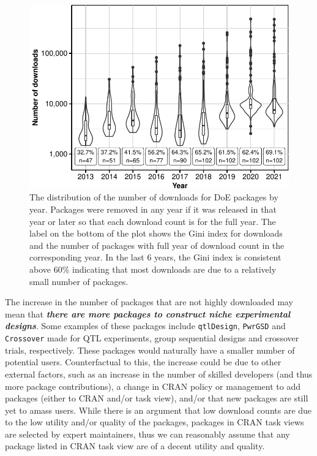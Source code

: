 \documentclass{article}
\begin{document}
\begin{figure}[htbp]

{\centering \includegraphics{figures/download-share-1} 

}

\caption{The distribution of the number of downloads for DoE packages by year. Packages were removed in any year if it was released in that year or later so that each download count is for the full year. The label on the bottom of the plot shows the Gini index for downloads and the number of packages with full year of download count in the corresponding year. In the last 6 years, the Gini index is consistent above 60\% indicating that most downloads are due to a relatively small number of packages. }\label{fig:download-share}
\end{figure}

The increase in the number of packages that are not highly downloaded
may mean that \textbf{\emph{there are more packages to construct niche
experimental designs}}. Some examples of these packages include
\texttt{qtlDesign}, \texttt{PwrGSD} and \texttt{Crossover} made for QTL
experiments, group sequential designs and crossover trials,
respectively. These packages would naturally have a smaller number of
potential users. Counterfactual to this, the increase could be due to
other external factors, such as an increase in the number of skilled
developers (and thus more package contributions), a change in CRAN
policy or management to add packages (either to CRAN and/or task view),
and/or that new packages are still yet to amass users. While there is an
argument that low download counts are due to the low utility and/or
quality of the packages, packages in CRAN task views are selected by
expert maintainers, thus we can reasonably assume that any package
listed in CRAN task view are of a decent utility and quality.
\end{document}
